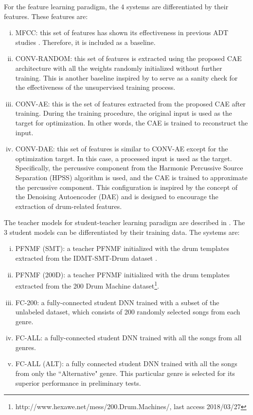 \documentclass{article}
\begin{document}
For the feature learning paradigm, the 4 systems are differentiated by their features. These features are: 
\begin{enumerate}[(i)]
\item MFCC: this set of features has shown its effectiveness in previous ADT studies \cite{PaulusK09_DrumTransHMM_JASMP, Thompson2014, SouzaBN15_CymbalClassi_IJCNN}. Therefore, it is included as a baseline.   
\item CONV-RANDOM: this set of features is extracted using the proposed CAE architecture with all the weights randomly initialized without further training. This is another baseline inspired by \cite{Choi2017a} to serve as a sanity check for the effectiveness of the unsupervised training process.  
\item CONV-AE: this is the set of features extracted from the proposed CAE after training. During the training procedure, the original input is used as the target for optimization. In other words, the CAE is trained to reconstruct the input. 
\item CONV-DAE: this set of features is similar to CONV-AE except for the optimization target. In this case, a processed input is used as the target. Specifically, the percussive component from the Harmonic Percussive Source Separation (HPSS) \cite{Fitzgerald2010} algorithm is used, and the CAE is trained to approximate the percussive component. This configuration is inspired by the concept of the Denoising Autoencoder (DAE) \cite{Vincent2008} and is designed to encourage the extraction of drum-related features. 
\end{enumerate}

The teacher models for student-teacher learning paradigm are described in \cite{Wu2017}. The 3 student models can be differentiated by their training data. The systems are: 
\begin{enumerate}[(i)]
\item PFNMF (SMT): a teacher PFNMF initialized with the drum templates extracted from the IDMT-SMT-Drum dataset \cite{DittmarG14_DrumTranscription_DAFX}.
\item PFNMF (200D): a teacher PFNMF initialized with the drum templates extracted from the 200 Drum Machine dataset\footnote{http://www.hexawe.net/mess/200.Drum.Machines/, last access 2018/03/27}.
\item FC-200: a fully-connected student DNN trained with a subset of the unlabeled dataset, which consists of 200 randomly selected songs from each genre. 
\item FC-ALL: a fully-connected student DNN trained with all the songs from all genres.
\item FC-ALL (ALT): a fully connected student DNN trained with all the songs from only the ``Alternative" genre. This particular genre is selected for its superior performance in preliminary tests. 
\end{enumerate}
\end{document}
